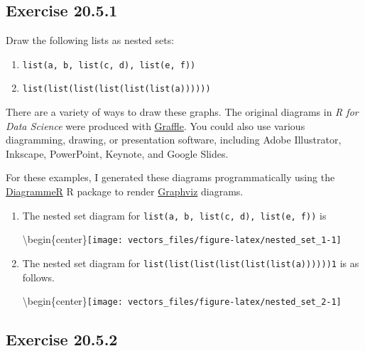\documentclass[]{book}
\providecommand{\tightlist}{%
  \setlength{\itemsep}{0pt}\setlength{\parskip}{0pt}}
\theoremstyle{plain}
\theoremstyle{remark}
\theoremstyle{definition}
\theoremstyle{definition}
\theoremstyle{definition}
\theoremstyle{remark}
\begin{document}
\hypertarget{exercise-20.5.1}{%
\subsection*{\texorpdfstring{Exercise
{20.5.1}}{Exercise 20.5.1}}\label{exercise-20.5.1}}

Draw the following lists as nested sets:

\begin{enumerate}
\def\labelenumi{\arabic{enumi}.}
\tightlist
\item
  \texttt{list(a,\ b,\ list(c,\ d),\ list(e,\ f))}
\item
  \texttt{list(list(list(list(list(list(a))))))}
\end{enumerate}

There are a variety of ways to draw these graphs. The original diagrams
in \emph{R for Data Science} were produced with
\href{https://www.omnigroup.com/omnigraffle}{Graffle}. You could also
use various diagramming, drawing, or presentation software, including
Adobe Illustrator, Inkscape, PowerPoint, Keynote, and Google Slides.

For these examples, I generated these diagrams programmatically using
the
\href{http://rich-iannone.github.io/DiagrammeR/graphviz_and_mermaid.html}{DiagrammeR}
R package to render \href{https://www.graphviz.org/}{Graphviz} diagrams.

\begin{enumerate}
\def\labelenumi{\arabic{enumi}.}
\item
  The nested set diagram for
  \texttt{list(a,\ b,\ list(c,\ d),\ list(e,\ f))} is

  \textbackslash{}begin\{center\}\texttt{[image: vectors\_files/figure-latex/nested\_set\_1-1]}
\item
  The nested set diagram for
  \texttt{list(list(list(list(list(list(a))))))1} is as follows.

  \textbackslash{}begin\{center\}\texttt{[image: vectors\_files/figure-latex/nested\_set\_2-1]}
\end{enumerate}

\hypertarget{exercise-20.5.2}{%
\subsection*{\texorpdfstring{Exercise
{20.5.2}}{Exercise 20.5.2}}\label{exercise-20.5.2}}
\end{document}
